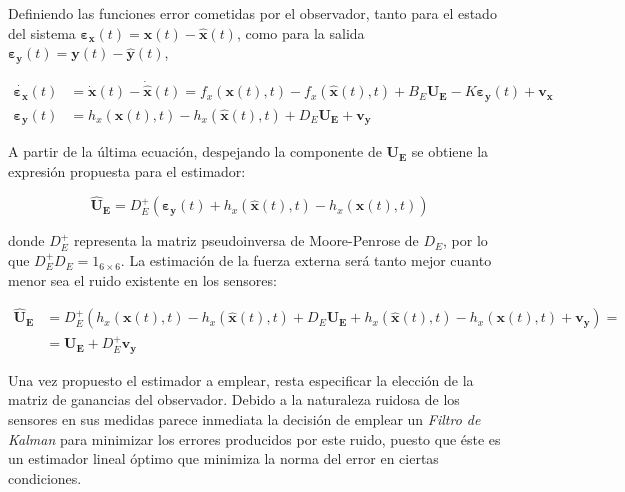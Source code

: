 Definiendo las funciones error cometidas por el observador, tanto para el estado del sistema $\boldsymbol{\varepsilon_x}(t) = \boldsymbol{x}(t) - \boldsymbol{\hat{x}}(t)$, como para la salida $\boldsymbol{\varepsilon_y}(t) = \boldsymbol{y}(t) - \boldsymbol{\hat{y}}(t)$,

\begin{subequations}
\begin{align}
	\boldsymbol{\dot{\varepsilon_x}}(t) &= \boldsymbol{\dot{x}}(t) - \boldsymbol{\dot{\hat{x}}}(t) = f_x(\boldsymbol{x}(t),t) - f_x(\boldsymbol{\hat{x}}(t),t) + B_E\boldsymbol{U_E} - K\boldsymbol{\varepsilon_y}(t) + \boldsymbol{v_x} \nonumber \\
	\boldsymbol{\varepsilon_y}(t) &= h_x(\boldsymbol{x}(t),t) -h_x(\boldsymbol{\hat{x}}(t),t) + D_E\boldsymbol{U_E} + \boldsymbol{v_y}
\end{align}
\label{eq:errorObservador}
\end{subequations}

A partir de la última ecuación, despejando la componente de $\boldsymbol{U_E}$ se obtiene la expresión propuesta para el estimador:

\begin{equation}
	\boldsymbol{\hat{U}_E} = D_E^{+}(\boldsymbol{\varepsilon_y}(t) + h_x(\boldsymbol{\hat{x}}(t),t) - h_x(\boldsymbol{x}(t),t))
\label{eq:estimador}
\end{equation}

\noindent
donde $D_E^{+}$ representa la matriz pseudoinversa de Moore-Penrose de $D_E$, por lo que $D_E^{+}D_E = 1_{6\times6}$. La estimación de la fuerza externa será tanto mejor cuanto menor sea el ruido existente en los sensores:

\begin{equation}
\begin{split}
	\boldsymbol{\hat{U}_E} &= D_E^{+}(h_x(\boldsymbol{x}(t),t) - h_x(\boldsymbol{\hat{x}}(t),t) + D_E\boldsymbol{U_E} + h_x(\boldsymbol{\hat{x}}(t),t) - h_x(\boldsymbol{x}(t),t) + \boldsymbol{v_y}) = \\
	&= \boldsymbol{U_E} + D_E^{+}\boldsymbol{v_y}
\end{split}
\label{eq:estimador-ruido}
\end{equation}

Una vez propuesto el estimador a emplear, resta especificar la elección de la matriz de ganancias del observador. Debido a la naturaleza ruidosa de los sensores en sus medidas parece inmediata la decisión de emplear un \emph{Filtro de Kalman} para minimizar los errores producidos por este ruido, puesto que éste es un estimador lineal óptimo que minimiza la norma del error en ciertas condiciones. \par


